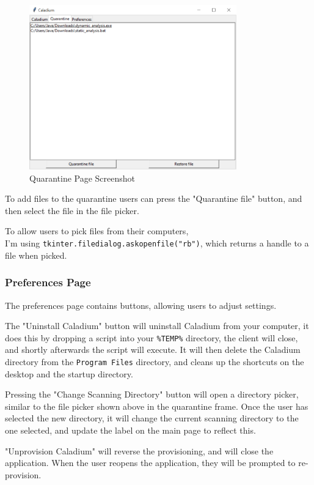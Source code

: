 \begin{figure}[h!]
    \centering
    \label{image:quarantinePageScreenshot}
    \includegraphics[width=0.8\textwidth]{../docs/client.png}
    \caption{Quarantine Page Screenshot}
\end{figure}

To add files to the quarantine users can press the "Quarantine file" button,
and then select the file in the file picker.

To allow users to pick files from their computers, \\
I'm using \texttt{tkinter.filedialog.askopenfile("rb")},
which returns a handle to a file when picked.

\subsubsection{Preferences Page}
The preferences page contains buttons,
allowing users to adjust settings.

The "Uninstall Caladium" button will uninstall Caladium from your computer,
it does this by dropping a script into your \texttt{\%TEMP\%} directory,
the client will close, and shortly afterwards the script will execute.
It will then delete the Caladium directory from the \texttt{Program Files} directory,
and cleans up the shortcuts on the desktop and the startup directory.

Pressing the "Change Scanning Directory" button will open a directory picker,
similar to the file picker shown above in the quarantine frame.
Once the user has selected the new directory,
it will change the current scanning directory to the one selected,
and update the label on the main page to reflect this.

"Unprovision Caladium" will reverse the provisioning,
and will close the application. When the user reopens
the application, they will be prompted to re-provision.

